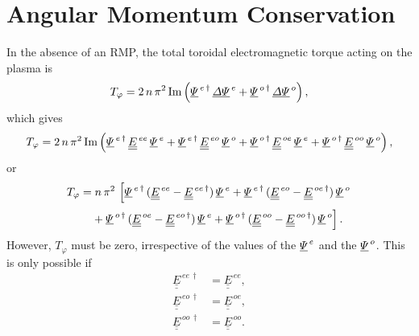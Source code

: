\documentclass[12pt,prb,aps,notitlepage]{revtex4-1}
\begin{document}
\section{Angular Momentum Conservation}
In the absence of an RMP, the total toroidal electromagnetic torque acting on the plasma
is
\begin{equation}
T_\varphi = 2\,n\,\pi^2\,{\rm Im}\left(\underline{\mit\Psi}^{\,e\,\dag} \,\underline{\mit\Delta\Psi}^{\,e} +\underline{\mit\Psi}^{\,o\,\dag} \,\underline{\mit\Delta\Psi}^{\,o}\right),
\end{equation}
which gives
\begin{equation}
T_\varphi = 2\,n\,\pi^2\,{\rm Im}\left(\underline{\mit\Psi}^{\,e\,\dag}\,\underline{\underline{E}}^{\,ee}  \,\underline{\mit\Psi}^{\,e}+\underline{\mit\Psi}^{\,e\,\dag}\,\underline{\underline{E}}^{\,eo}  \,\underline{\mit\Psi}^{\,o}
+ \underline{\mit\Psi}^{\,o\,\dag}\,\underline{\underline{E}}^{\,oe}  \,\underline{\mit\Psi}^{\,e}+\underline{\mit\Psi}^{\,o\,\dag}\,\underline{\underline{E}}^{\,oo}  \,\underline{\mit\Psi}^{\,o}\right),
\end{equation}
or
\begin{align}
T_\varphi &= n\,\pi^2\,\left[\underline{\mit\Psi}^{\,e\,\dag}\,(\underline{\underline{E}}^{\,ee}-  \underline{\underline{E}}^{\,ee\,\dag})\,\underline{\mit\Psi}^{\,e}+\underline{\mit\Psi}^{\,e\,\dag}\,(\underline{\underline{E}}^{\,eo}-  \underline{\underline{E}}^{\,oe\,\dag})\,\underline{\mit\Psi}^{\,o}\right.\nonumber\\[0.5ex]
&\left.\phantom{=}+\underline{\mit\Psi}^{\,o\,\dag}\,(\underline{\underline{E}}^{\,oe}-  \underline{\underline{E}}^{\,eo\,\dag})\,\underline{\mit\Psi}^{\,e}+ \underline{\mit\Psi}^{\,o\,\dag}\,(\underline{\underline{E}}^{\,oo}-  \underline{\underline{E}}^{\,oo\,\dag})\,\underline{\mit\Psi}^{\,o}\right].
\end{align}
However, $T_\varphi$ must be zero, irrespective of the values of the $\underline{\mit\Psi}^{\,e}$ and the $\underline{\mit\Psi}^{\,o}$. This is only possible if
\begin{align}
\underline{\underline{E}}^{\,ee\,\dag} &=\underline{\underline{E}}^{\,ee},\\[0.5ex]
\underline{\underline{E}}^{\,eo\,\dag} &=\underline{\underline{E}}^{\,oe},\\[0.5ex]
\underline{\underline{E}}^{\,oo\,\dag} &=\underline{\underline{E}}^{\,oo}.
\end{align}
\end{document}
